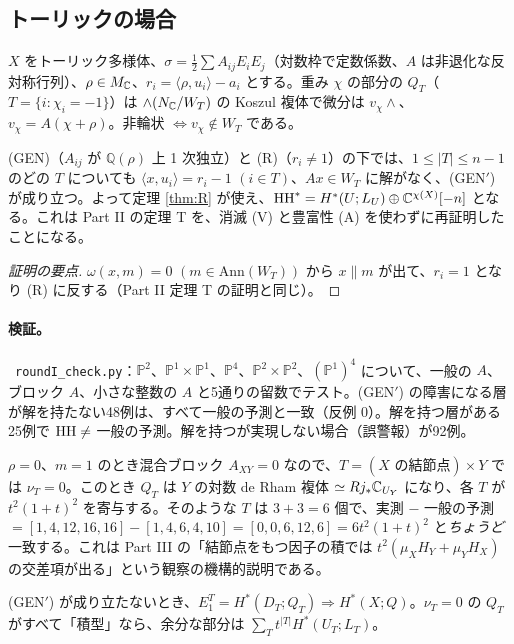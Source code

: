 \subsection{トーリックの場合}\label{sec:toric}
$X$ をトーリック多様体、$\sigma=\tfrac12\sum A_{ij}E_iE_j$（対数枠で定数係数、$A$ は非退化な反対称行列）、$\rho\in M_\mathbb C$、$r_i=\langle\rho,u_i\rangle-a_i$ とする。重み $\chi$ の部分の $Q_T$（$T=\{i:\chi_i=-1\}$）は $\wedge(N_\mathbb C/W_T)$ の Koszul 複体で微分は $v_\chi\wedge$、$v_\chi=A(\chi+\rho)$。非輪状 $\iff v_\chi\notin W_T$ である。\tP
\begin{prop}\tP\label{prop:toric}
(GEN)（$A_{ij}$ が $\mathbb Q(\rho)$ 上 1 次独立）と (R)（$r_i\neq1$）の下では、$1\le|T|\le n-1$ のどの $T$ についても $\langle x,u_i\rangle=r_i-1$ $(i\in T)$、$Ax\in W_T$ に解がなく、(GEN$'$) が成り立つ。よって定理 \ref{thm:R} が使え、$\mathrm{HH}^*=H^*(U;L_U)\oplus\mathbb C^{\chi(X)}[-n]$ となる。これは Part II の定理 T を、消滅 (V) と豊富性 (A) を使わずに再証明したことになる。
\end{prop}
\begin{proof}[証明の要点]
$\omega(x,m)=0$ $(m\in\mathrm{Ann}(W_T))$ から $x\parallel m$ が出て、$r_i=1$ となり (R) に反する（Part II 定理 T の証明と同じ）。\qedhere
\end{proof}
\paragraph{検証。}\tV\ \texttt{roundI\_check.py}：$\mathbb P^2$、$\mathbb P^1\times\mathbb P^1$、$\mathbb P^4$、$\mathbb P^2\times\mathbb P^2$、$(\mathbb P^1)^4$ について、一般の $A$、ブロック $A$、小さな整数の $A$ と5通りの留数でテスト。(GEN$'$) の障害になる層が解を持たない48例は、すべて一般の予測と一致（反例 0）。解を持つ層がある25例で $\mathrm{HH}\neq$ 一般の予測。解を持つが実現しない場合（誤警報）が92例。

\begin{ex}[$\mathbb P^2\times\mathbb P^2$、ブロック $A=A_X\oplus A_Y$]\tP\tV
$\rho=0$、$m=1$ のとき混合ブロック $A_{XY}=0$ なので、$T=(X\text{ の結節点})\times Y$ では $\nu_T=0$。このとき $Q_T$ は $Y$ の対数 de Rham 複体 $\simeq Rj_*\mathbb C_{U_Y}$ になり、各 $T$ が $t^2(1+t)^2$ を寄与する。そのような $T$ は $3+3=6$ 個で、実測 $-$ 一般の予測 $=[1,4,12,16,16]-[1,4,6,4,10]=[0,0,6,12,6]=6t^2(1+t)^2$ と\emph{ちょうど}一致する。これは Part III の「結節点をもつ因子の積では $t^2(\mu_XH_Y+\mu_YH_X)$ の交差項が出る」という観察の機構的説明である。
\end{ex}
\begin{conj}[\tK\ 層が非輪状でない場合]\label{conj:nonacyc}
(GEN$'$) が成り立たないとき、$E_1^T=H^*(D_T;Q_T)\Rightarrow H^*(X;Q)$。$\nu_T=0$ の $Q_T$ がすべて「積型」なら、余分な部分は $\sum_Tt^{|T|}H^*(U_T;L_T)$。
\end{conj}

